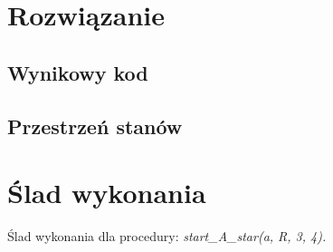 \documentclass[11pt]{article} %
\begin{document}
\section{Rozwiązanie}

\subsection{Wynikowy kod}



\subsection{Przestrzeń stanów}



\section{Ślad wykonania}

Ślad wykonania dla procedury: \textit{start\_A\_star(a, R, 3, 4).}
\end{document}
